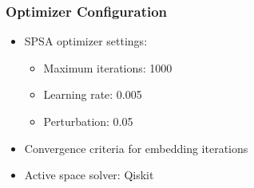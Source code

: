 \begin{frame}
\frametitle{Optimizer Configuration}
\begin{itemize}
    \item SPSA optimizer settings:
    \begin{itemize}
        \item Maximum iterations: 1000
        \item Learning rate: 0.005
        \item Perturbation: 0.05
    \end{itemize}
    \item Convergence criteria for embedding iterations
    \item Active space solver: Qiskit
\end{itemize}
\end{frame} 